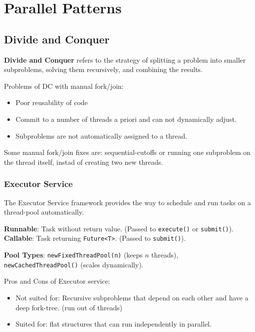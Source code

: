 \section{Parallel Patterns}

\subsection{Divide and Conquer}

\begin{definition}
\textbf{Divide and Conquer } refers to the strategy of splitting a problem into smaller subproblems,
                solving them recursively, and combining the results.
\end{definition}

Problems of DC with manual fork/join:
\begin{itemize}
    \item Poor reusability of code
    \item Commit to a number of threads a priori and can not dynamically adjust.
    \item Subproblems are not automatically assigned to a thread.
\end{itemize}

\begin{remark}
Some manual fork/join fixes are: sequential-cutoffs or running one
subproblem on the thread itself, instad of creating two new threads.
\end{remark}

\subsubsection{Executor Service}

The Executor Service framework provides the way to schedule and run tasks on a thread-pool automatically.

\begin{definition}
\textbf{Runnable}: Task without return value. (Passed to \texttt{execute()} or \texttt{submit()}).
\textbf{Callable}: Task returning \texttt{Future<T>}. (Passed to \texttt{submit()}).
\end{definition}

\begin{remark}
\textbf{Pool Types}: \texttt{newFixedThreadPool(n)} (keeps $n$ threads), \texttt{newCachedThreadPool()} (scales dynamically).
\end{remark}

Pros and Cons of Executor service:
\begin{itemize}
    \item Not suited for: Recursive subproblems that depend on each other and have a deep fork-tree. (run out of threads)
    \item Suited for: flat structures that can run independently in parallel.
\end{itemize}

